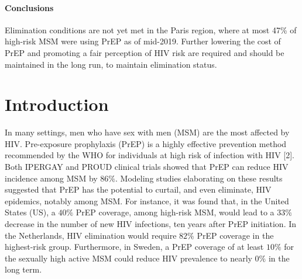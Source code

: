 \documentclass[preprint,review,12pt]{article}			%
\begin{document}
\paragraph{Conclusions}
Elimination conditions are not yet met in the Paris region, where at most 47\% of high-risk MSM were using PrEP as of mid-2019. Further lowering the cost of PrEP and promoting a fair perception of HIV risk are required and should be maintained in the long run, to maintain elimination status.




\linenumbers
\modulolinenumbers[5]



\section{Introduction} \label{sec:Intro}

In many settings, men who have sex with men (MSM) are the most affected by HIV.\cite{Beyrer2016} Pre-exposure prophylaxis (PrEP) is a highly effective prevention method recommended by the WHO for individuals at high risk of infection with HIV [2]. Both IPERGAY and PROUD clinical trials showed that PrEP can reduce HIV incidence among MSM by $86\%$.\cite{Molina2015,McCormack2016} Modeling studies elaborating on these results suggested that PrEP has the potential to curtail, and even eliminate, HIV epidemics, notably among MSM.\cite{Jenness2016,Rozhnova2018,Hansson2020,Scott2018} For instance, it was found that, in the United States (US), a $40\%$ PrEP coverage, among high-risk MSM, would lead to a $33\%$ decrease in the number of new HIV infections, ten years after PrEP initiation.\cite{Jenness2016} In the Netherlands, HIV elimination would require $82\%$ PrEP coverage in the highest-risk group.\cite{Rozhnova2018} Furthermore, in Sweden, a PrEP coverage of at least $10\%$ for the sexually high active MSM could reduce HIV prevalence to nearly $0\%$ in the long term.\cite{Hansson2020}
\end{document}
